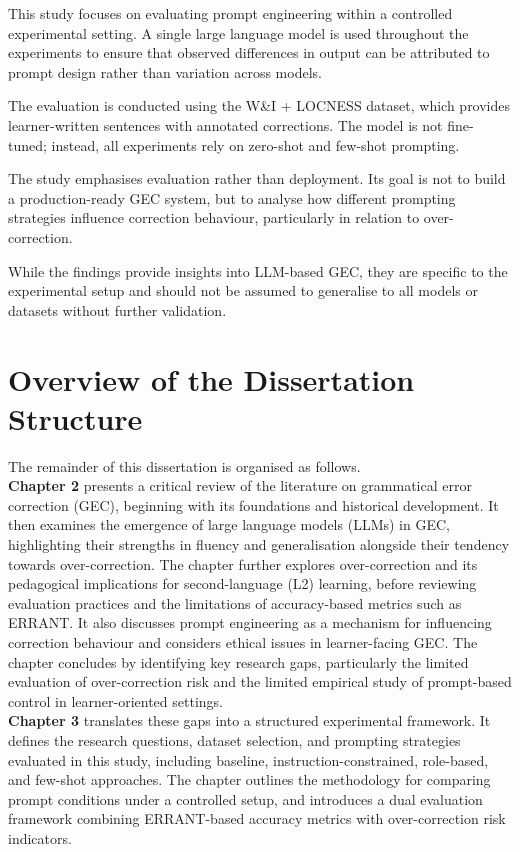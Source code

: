 This study focuses on evaluating prompt engineering within a controlled experimental setting. A single large language model is used throughout the experiments to ensure that observed differences in output can be attributed to prompt design rather than variation across models.

The evaluation is conducted using the W\&I + LOCNESS dataset, which provides learner-written sentences with annotated corrections. The model is not fine-tuned; instead, all experiments rely on zero-shot and few-shot prompting.

The study emphasises evaluation rather than deployment. Its goal is not to build a production-ready GEC system, but to analyse how different prompting strategies influence correction behaviour, particularly in relation to over-correction.

While the findings provide insights into LLM-based GEC, they are specific to the experimental setup and should not be assumed to generalise to all models or datasets without further validation.

\section{Overview of the Dissertation Structure}

The remainder of this dissertation is organised as follows.\\

\textbf{Chapter 2} presents a critical review of the literature on grammatical error correction (GEC), beginning with its foundations and historical development. It then examines the emergence of large language models (LLMs) in GEC, highlighting their strengths in fluency and generalisation alongside their tendency towards over-correction. The chapter further explores over-correction and its pedagogical implications for second-language (L2) learning, before reviewing evaluation practices and the limitations of accuracy-based metrics such as ERRANT. It also discusses prompt engineering as a mechanism for influencing correction behaviour and considers ethical issues in learner-facing GEC. The chapter concludes by identifying key research gaps, particularly the limited evaluation of over-correction risk and the limited empirical study of prompt-based control in learner-oriented settings.\\

\textbf{Chapter 3} translates these gaps into a structured experimental framework. It defines the research questions, dataset selection, and prompting strategies evaluated in this study, including baseline, instruction-constrained, role-based, and few-shot approaches. The chapter outlines the methodology for comparing prompt conditions under a controlled setup, and introduces a dual evaluation framework combining ERRANT-based accuracy metrics with over-correction risk indicators.\\

